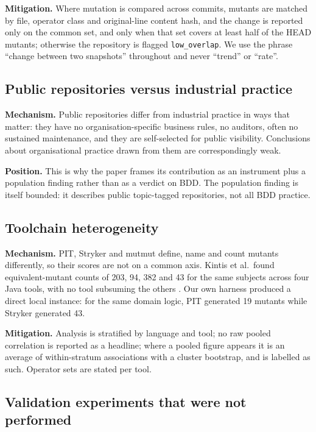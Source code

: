\textbf{Mitigation.} Where mutation is compared across commits, mutants are matched by file, operator
class and original-line content hash, and the change is reported only on the common set, and only when
that set covers at least half of the HEAD mutants; otherwise the repository is flagged
\texttt{low\_overlap}. We use the phrase ``change between two snapshots'' throughout and never
``trend'' or ``rate''.

\subsection{Public repositories versus industrial practice}

\textbf{Mechanism.} Public repositories differ from industrial practice in ways that matter: they have
no organisation-specific business rules, no auditors, often no sustained maintenance, and they are
self-selected for public visibility. Conclusions about organisational practice drawn from them are
correspondingly weak.

\textbf{Position.} This is why the paper frames its contribution as an instrument plus a population
finding rather than as a verdict on BDD. The population finding is itself bounded: it describes public
topic-tagged repositories, not all BDD practice.

\subsection{Toolchain heterogeneity}

\textbf{Mechanism.} PIT, Stryker and mutmut define, name and count mutants differently, so their scores
are not on a common axis. Kintis et al.\ found equivalent-mutant counts of 203, 94, 382 and 43 for the
same subjects across four Java tools, with no tool subsuming the others
\citep{Kintis2018HowEffectiveTools}. Our own harness produced a direct local instance: for the same
domain logic, PIT generated 19 mutants while Stryker generated 43.

\textbf{Mitigation.} Analysis is stratified by language and tool; no raw pooled correlation is
reported as a headline; where a pooled figure appears it is an average of within-stratum associations
with a cluster bootstrap, and is labelled as such. Operator sets are stated per tool.

\subsection{Validation experiments that were not performed}

